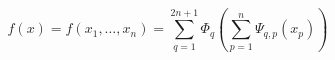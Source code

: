 \documentclass[journal]{IEEEtran}
\begin{document}
\begin{equation}
	f(x) = f(x_1,\ldots,x_n)=\sum_{q=1}^{2n+1}\Phi_q \left( \sum_{p=1}^{n}\Psi_{q,p}(x_p) \right)
	\label{eq.1}
\end{equation}


\end{document}
